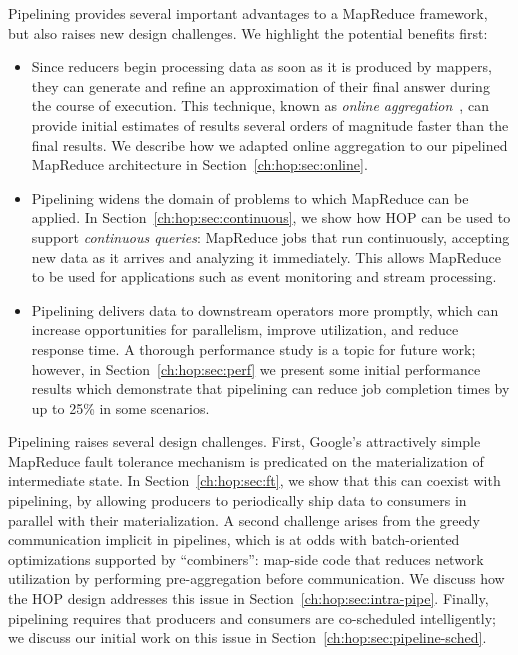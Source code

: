 Pipelining provides several important advantages to a MapReduce
framework, but also raises new design challenges. We highlight the
potential benefits first:
\begin{itemize}
\item
  Since reducers begin processing data as soon as it is produced by mappers,
  they can generate and refine an approximation of their final answer during the
  course of execution. This technique, known as \emph{online
    aggregation}~\cite{onlineagg}, can provide initial estimates of results
  several orders of magnitude faster than the final results.  We
  describe how we adapted online aggregation to our pipelined MapReduce
  architecture in Section~\ref{ch:hop:sec:online}.

\item
  Pipelining widens the domain of problems to which MapReduce can be applied. In
  Section~\ref{ch:hop:sec:continuous}, we show how HOP can be used to support
  \emph{continuous queries}: MapReduce jobs that run continuously, accepting new
  data as it arrives and analyzing it immediately. This allows MapReduce to be
  used for applications such as event monitoring and stream processing.

\item
  Pipelining delivers data to downstream operators more promptly, which can
  increase opportunities for parallelism, improve utilization, and reduce
  response time. A thorough performance study is a topic for future work;
  however, in Section~\ref{ch:hop:sec:perf} we present some initial performance
  results which demonstrate that pipelining can reduce job completion times by
  up to 25\% in some scenarios.
\end{itemize}

Pipelining raises several design challenges. First, Google's attractively simple
MapReduce fault tolerance mechanism is predicated on the materialization of
intermediate state. In Section~\ref{ch:hop:sec:ft}, we show that this can coexist with
pipelining, by allowing producers to periodically ship data to consumers in
parallel with their materialization.  A second challenge arises from the greedy
communication implicit in pipelines, which is at odds with batch-oriented
optimizations supported by ``combiners'': map-side code that reduces network
utilization by performing pre-aggregation before
communication. We discuss how the HOP design addresses this issue in
Section~\ref{ch:hop:sec:intra-pipe}.  Finally, pipelining requires that producers and
consumers are co-scheduled intelligently; we discuss our initial work on this
issue in Section~\ref{ch:hop:sec:pipeline-sched}.

